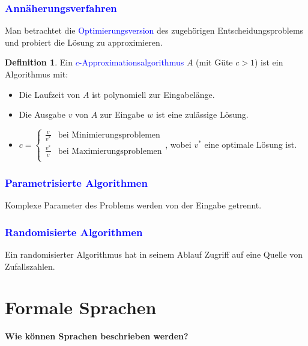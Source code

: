 \documentclass{scrreprt}
\theoremstyle{definition}
\newtheorem{Definition}{Definition}[section]
\theoremstyle{example}
\theoremstyle{algorithm}
\begin{document}
\subsection{\textcolor{blue}{Annäherungsverfahren}}
Man betrachtet die \textcolor{blue}{Optimierungsversion} des zugehörigen Entscheidungsproblems und probiert die Lösung zu approximieren.
\begin{Definition}
Ein \textcolor{blue}{$c$-Approximationsalgorithmus} $A$ (mit Güte $c > 1$) ist ein Algorithmus mit:
\begin{itemize}
\item
Die Laufzeit von $A$ ist polynomiell zur Eingabelänge.
\item
Die Ausgabe $v$ von $A$ zur Eingabe $w$ ist eine zulässige Lösung.
\item
$c=
\begin{cases}
\frac{v}{v^*}& \text{bei Minimierungsproblemen}\\
\frac{v^*}{v}& \text{bei Maximierungsproblemen}\\
\end{cases}$, wobei $v^*$ eine optimale Lösung ist.
\end{itemize}
\end{Definition}
\subsection{\textcolor{blue}{Parametrisierte Algorithmen}}
Komplexe Parameter des Problems werden von der Eingabe getrennt.

\subsection{\textcolor{blue}{Randomisierte Algorithmen}}
Ein randomisierter Algorithmus hat in seinem Ablauf Zugriff auf eine Quelle von Zufallszahlen.

\chapter{Formale Sprachen}
{\Large\textbf{\textsf{Wie können Sprachen beschrieben werden?}}}
\end{document}
